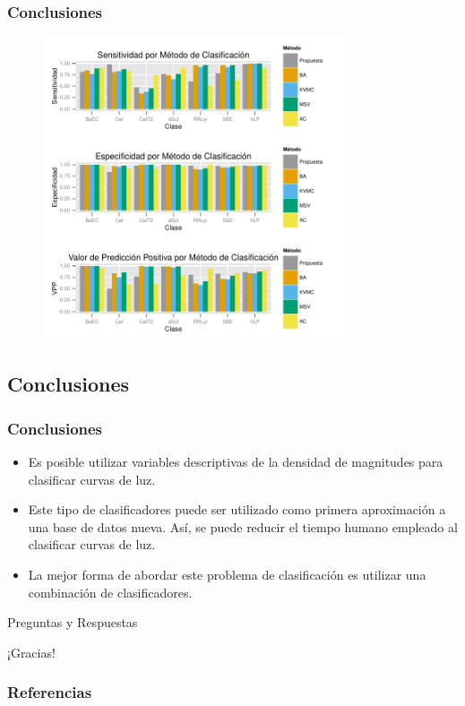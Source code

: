 \documentclass{beamer}
\begin{document}
\begin{frame}
\frametitle{Conclusiones}
  \begin{figure}
    \centering
    \includegraphics[width=0.8\textwidth]{./img/resumen.pdf}
    \caption{}
  \end{figure}
\end{frame}

\subsection{Conclusiones}
\begin{frame}
  \frametitle{Conclusiones}
  \begin{itemize}
  \item Es posible utilizar variables descriptivas de la densidad de magnitudes para clasificar curvas de luz.
  \item Este tipo de clasificadores puede ser utilizado como primera aproximación a una base de datos nueva. Así, se puede reducir el tiempo humano empleado al clasificar curvas de luz. 
  \item La mejor forma de abordar este problema de clasificación es utilizar una combinación de clasificadores.
  \end{itemize}
\end{frame}

\begin{frame}
  Preguntas y Respuestas
\end{frame}

\begin{frame}
  ¡Gracias!
\end{frame}


\begin{frame}[allowframebreaks]
  \frametitle{Referencias}
  
  
\end{frame}
\end{document}
